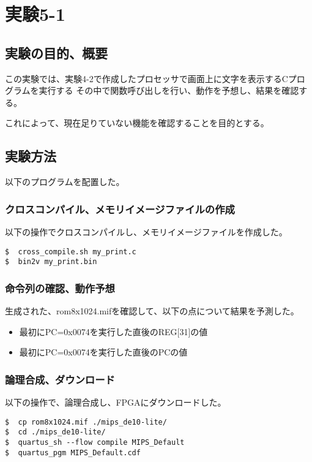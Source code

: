 \section{実験5-1}
\subsection{実験の目的、概要}
この実験では、実験4-2で作成したプロセッサで画面上に文字を表示するCプログラムを実行する
その中で関数呼び出しを行い、動作を予想し、結果を確認する。

これによって、現在足りていない機能を確認することを目的とする。

\subsection{実験方法}
以下のプログラムを配置した。
% 

\subsubsection{クロスコンパイル、メモリイメージファイルの作成}
以下の操作でクロスコンパイルし、メモリイメージファイルを作成した。
\begin{lstlisting}[caption={クロスコンパイル、メモリイメージファイルの作成},label={クロスコンパイル、メモリイメージファイルの作成5-1}]
$  cross_compile.sh my_print.c
$  bin2v my_print.bin
\end{lstlisting}

\subsubsection{命令列の確認、動作予想}
生成された、rom8x1024.mifを確認して、以下の点について結果を予測した。
\begin{itemize}
  \item 最初にPC=0x0074を実行した直後のREG[31]の値
  \item 最初にPC=0x0074を実行した直後のPCの値
\end{itemize}

\subsubsection{論理合成、ダウンロード}
以下の操作で、論理合成し、FPGAにダウンロードした。
\begin{lstlisting}[caption={論理合成、ダウンロード},label={論理合成、ダウンロード5-1}]
$  cp rom8x1024.mif ./mips_de10-lite/
$  cd ./mips_de10-lite/
$  quartus_sh --flow compile MIPS_Default
$  quartus_pgm MIPS_Default.cdf
\end{lstlisting}

